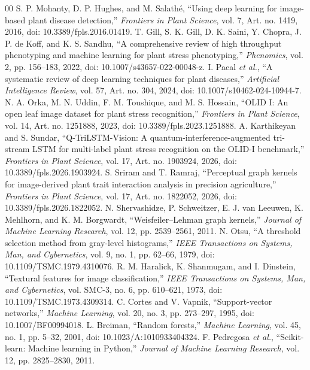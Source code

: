 \documentclass[conference]{IEEEtran}
\begin{document}
\begin{thebibliography}{00}
 S. P. Mohanty, D. P. Hughes, and M. Salath\'e, ``Using deep learning for image-based plant disease detection,'' \emph{Frontiers in Plant Science}, vol. 7, Art. no. 1419, 2016, doi: 10.3389/fpls.2016.01419.
 T. Gill, S. K. Gill, D. K. Saini, Y. Chopra, J. P. de Koff, and K. S. Sandhu, ``A comprehensive review of high throughput phenotyping and machine learning for plant stress phenotyping,'' \emph{Phenomics}, vol. 2, pp. 156--183, 2022, doi: 10.1007/s43657-022-00048-z.
 I. Pacal \emph{et al.}, ``A systematic review of deep learning techniques for plant diseases,'' \emph{Artificial Intelligence Review}, vol. 57, Art. no. 304, 2024, doi: 10.1007/s10462-024-10944-7.
 N. A. Orka, M. N. Uddin, F. M. Toushique, and M. S. Hossain, ``OLID I: An open leaf image dataset for plant stress recognition,'' \emph{Frontiers in Plant Science}, vol. 14, Art. no. 1251888, 2023, doi: 10.3389/fpls.2023.1251888.
 A. Karthikeyan and S. Sundar, ``Q-TriLSTM-Vision: A quantum-interference-augmented tri-stream LSTM for multi-label plant stress recognition on the OLID-I benchmark,'' \emph{Frontiers in Plant Science}, vol. 17, Art. no. 1903924, 2026, doi: 10.3389/fpls.2026.1903924.
 S. Sriram and T. Ramraj, ``Perceptual graph kernels for image-derived plant trait interaction analysis in precision agriculture,'' \emph{Frontiers in Plant Science}, vol. 17, Art. no. 1822052, 2026, doi: 10.3389/fpls.2026.1822052.
 N. Shervashidze, P. Schweitzer, E. J. van Leeuwen, K. Mehlhorn, and K. M. Borgwardt, ``Weisfeiler--Lehman graph kernels,'' \emph{Journal of Machine Learning Research}, vol. 12, pp. 2539--2561, 2011.
 N. Otsu, ``A threshold selection method from gray-level histograms,'' \emph{IEEE Transactions on Systems, Man, and Cybernetics}, vol. 9, no. 1, pp. 62--66, 1979, doi: 10.1109/TSMC.1979.4310076.
 R. M. Haralick, K. Shanmugam, and I. Dinstein, ``Textural features for image classification,'' \emph{IEEE Transactions on Systems, Man, and Cybernetics}, vol. SMC-3, no. 6, pp. 610--621, 1973, doi: 10.1109/TSMC.1973.4309314.
 C. Cortes and V. Vapnik, ``Support-vector networks,'' \emph{Machine Learning}, vol. 20, no. 3, pp. 273--297, 1995, doi: 10.1007/BF00994018.
 L. Breiman, ``Random forests,'' \emph{Machine Learning}, vol. 45, no. 1, pp. 5--32, 2001, doi: 10.1023/A:1010933404324.
 F. Pedregosa \emph{et al.}, ``Scikit-learn: Machine learning in Python,'' \emph{Journal of Machine Learning Research}, vol. 12, pp. 2825--2830, 2011.
\end{thebibliography}
\end{document}
